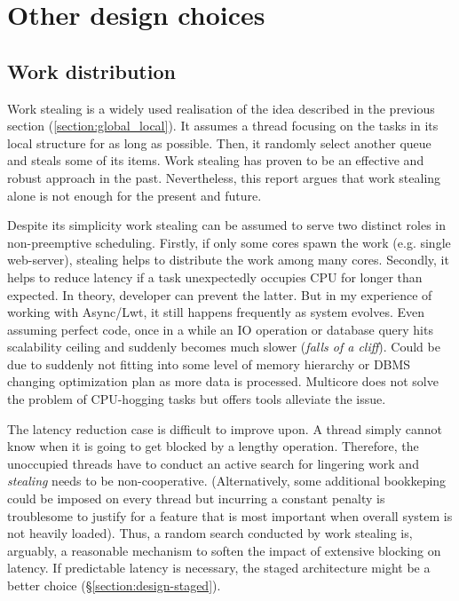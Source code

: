 \documentclass[12pt,a4paper,twoside]{report}
\begin{document}
\section{Other design choices}
\label{section:other_design_choices}

\subsection{Work distribution}
\label{section:work-distribution}
Work stealing is a widely used realisation of the idea described in the previous section (\ref{section:global_local}). It assumes a thread focusing on the tasks in its local structure for as long as possible. Then, it randomly select another queue and steals some of its items. Work stealing has proven to be an effective and robust approach in the past. Nevertheless, this report argues that work stealing alone is not enough for the present and future. 

Despite its simplicity work stealing can be assumed to serve two distinct roles in non-preemptive scheduling. Firstly, if only some cores spawn the work (e.g. single web-server), stealing helps to distribute the work among many cores. Secondly, it helps to reduce latency if a task unexpectedly occupies CPU for longer than expected. In theory, developer can prevent the latter. But in my experience of working with Async/Lwt, it still happens frequently as system evolves. Even assuming perfect code, once in a while an IO operation or database query hits scalability ceiling and suddenly becomes much slower (\textit{falls of a cliff}). Could be due to suddenly not fitting into some level of memory hierarchy or DBMS changing optimization plan as more data is processed. Multicore does not solve the problem of CPU-hogging tasks but offers tools alleviate the issue.

The latency reduction case is difficult to improve upon. A thread simply cannot know when it is going to get blocked by a lengthy operation. Therefore, the unoccupied threads have to conduct an active search for lingering work and \textit{stealing} needs to be non-cooperative. (Alternatively, some additional bookkeping could be imposed on every thread but incurring a constant penalty is troublesome to justify for a feature that is most important when overall system is not heavily loaded). Thus, a random search conducted by work stealing is, arguably, a reasonable mechanism to soften the impact of extensive blocking on latency. If predictable latency is necessary, the staged architecture might be a better choice (\S\ref{section:design-staged}).
\end{document}
